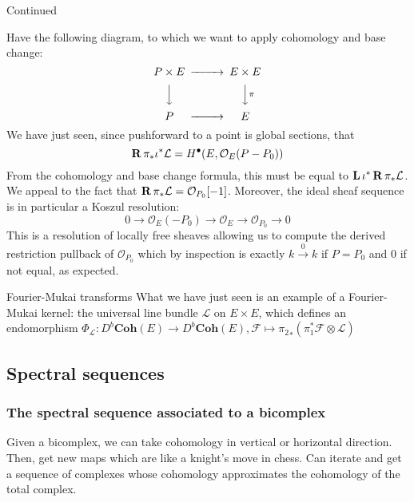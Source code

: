 \begin{example}{Continued}{}

Have the following diagram, to which we want to apply cohomology and base change: $$\begin{CD}
P\times E @> > > E\times E\\ @VVV @VV\pi V \\ P @> > > E
\end{CD}$$
We have just seen, since pushforward to a point is global sections, that$$\operatorname{\mathbf{R}} \pi_{*}\iota^*\mathcal{L}=H^\bullet(E, \mathcal{O}_{E}(P-P_{0}))$$From the cohomology and base change formula, this must be equal to $\operatorname{\mathbf{L}} \iota^*\operatorname{\mathbf{R}} \pi_{*}\mathcal{L}$. We appeal to the fact that $\operatorname{\mathbf{R}} \pi_{*}\mathcal{L}=\mathcal{O}_{P_{0}}[-1]$. Moreover, the ideal sheaf sequence is in particular a Koszul resolution: $$0\rightarrow \mathcal{O}_{E}(-P_{0})\xrightarrow{}\mathcal{O}_{E}\xrightarrow{}\mathcal{O}_{{P_{0}}}\xrightarrow{}0$$This is a resolution of locally free sheaves allowing us to compute the derived restriction pullback of $\mathcal{O}_{{P}_{0}}$ which by inspection is exactly $k\xrightarrow{0}k$ if $P=P_0$ and $0$ if not equal, as expected. 


\end{example}

\begin{remark}{Fourier-Mukai transforms}{}
    What we have just seen is an example of a Fourier-Mukai kernel: the universal line bundle $\mathcal{L}$ on $E\times E$, which defines an endomorphism $\Phi_\mathcal{L}:D^b \mathbf{Coh}(E)\rightarrow D^b \mathbf{Coh}(E), \mathcal{F}\mapsto {\pi_2}_*(\pi_1^* \mathcal{F} \otimes \mathcal{L})$
    
\end{remark}

\subsection{Spectral sequences}
\subsubsection{The spectral sequence associated to a bicomplex}

Given a bicomplex, we can take cohomology in vertical or horizontal direction. Then, get new maps which are like a knight's move in chess. Can iterate and get a sequence of complexes whose cohomology approximates the cohomology of the total complex.

